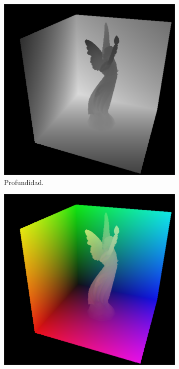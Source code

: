 \begin{figure}[H]
	\centering
	\begin{subfigure}[t]{.24\linewidth}
		\centering
		\captionsetup{justification=centering}
		\includegraphics[width=\linewidth]{media/rsmd.png}
		\caption*{Profundidad.}
	\end{subfigure}
	\begin{subfigure}[t]{.24\linewidth}
		\centering
		\captionsetup{justification=centering}
		\includegraphics[width=\linewidth]{media/rsmp.png}

\end{subfigure}
\end{figure}
